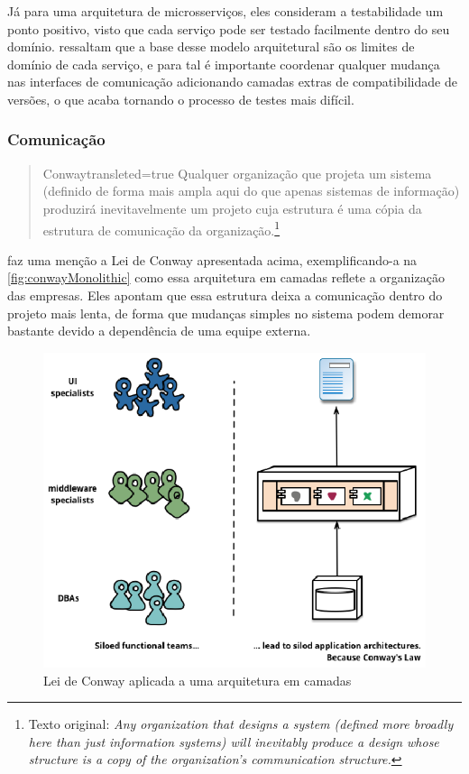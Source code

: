 Já para uma arquitetura de microsserviços, eles consideram a testabilidade um ponto positivo, visto que
cada serviço pode ser testado facilmente dentro do seu domínio. 
ressaltam que a base desse modelo arquitetural são os limites de domínio de cada serviço, e
para tal é importante coordenar qualquer mudança nas interfaces de comunicação adicionando camadas
extras de compatibilidade de versões, o que acaba tornando o processo de testes mais difícil.

\subsubsection{Comunicação}
\label{pers:comunicacao}

\begin{quotation}{Conway}{transleted=true}
    Qualquer organização que projeta um sistema (definido de forma mais ampla aqui do que apenas sistemas de informação)
    produzirá inevitavelmente um projeto cuja estrutura é uma cópia da estrutura de comunicação da
    organização.\footnote{Texto original: \textit{Any organization that designs a system (defined more broadly
    here than just information systems) will inevitably produce a design whose structure is a copy
    of the organization's communication structure.}}
\end{quotation}

 faz uma menção a Lei de Conway apresentada acima,
exemplificando-a na \autoref{fig:conwayMonolithic} como essa arquitetura em camadas reflete a
organização das empresas. Eles apontam que essa estrutura deixa a comunicação dentro do projeto mais
lenta, de forma que mudanças simples no sistema podem demorar bastante devido a dependência de uma
equipe externa.

\begin{figure}[h]
  \centering
  \includegraphics[keepaspectratio=true,scale=1]{figuras/conwayMonolithic.eps}
  \caption{Lei de Conway aplicada a uma arquitetura em camadas\label{fig:conwayMonolithic} }
\end{figure}

